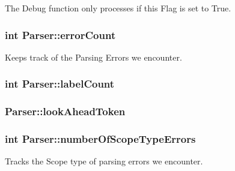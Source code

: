 The Debug function only processes if this Flag is set to True. 

\hypertarget{classParser_a613d04900f76c66dfdf41e47aff6e539}{
\subsubsection[{errorCount}]{\setlength{\rightskip}{0pt plus 5cm}int {\bf Parser::errorCount}}}
\label{classParser_a613d04900f76c66dfdf41e47aff6e539}


Keeps track of the Parsing Errors we encounter. 

\hypertarget{classParser_a10a64572cec26c50bdef9575fc79540e}{
\subsubsection[{labelCount}]{\setlength{\rightskip}{0pt plus 5cm}int {\bf Parser::labelCount}}}
\label{classParser_a10a64572cec26c50bdef9575fc79540e}
\hypertarget{classParser_a4f9e59e89197efefa1feff50f5ea8725}{
\subsubsection[{lookAheadToken}]{ {\bf Parser::lookAheadToken}}}
\label{classParser_a4f9e59e89197efefa1feff50f5ea8725}
\hypertarget{classParser_a43e9e43e927c28bc883fd7ff20d165a1}{
\subsubsection[{numberOfScopeTypeErrors}]{\setlength{\rightskip}{0pt plus 5cm}int {\bf Parser::numberOfScopeTypeErrors}}}
\label{classParser_a43e9e43e927c28bc883fd7ff20d165a1}


Tracks the Scope type of parsing errors we encounter. 

